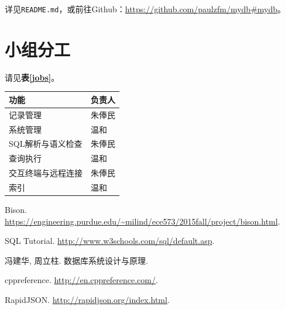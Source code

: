 \documentclass[11pt, a4paper]{article}
\makeatletter
\newcommand\tcaption{\def\@captype{table}\caption}
\newcommand{\tref}[1]{\textbf{表\ref{#1}}}
\makeatother
\begin{document}
详见\texttt{README.md}，或前往Github：\url{https://github.com/paulzfm/mydb#mydb}。

\section{小组分工}

请见\tref{jobs}。

\begin{center}
    \tcaption{小组分工}\label{jobs}
    \begin{tabular}{ll}
        \toprule
        功能 & 负责人 \\
        \midrule
        记录管理 & 朱俸民 \\
        系统管理 & 温和 \\
        SQL解析与语义检查 & 朱俸民 \\
        查询执行 & 温和 \\
        交互终端与远程连接 & 朱俸民 \\
        索引 & 温和 \\
        \bottomrule
    \end{tabular}
\end{center}

\renewcommand{\refname}{参考资料}

\begin{thebibliography}{9}

 Bison. \url{https://engineering.purdue.edu/~milind/ece573/2015fall/project/bison.html}.

 SQL Tutorial. \url{http://www.w3schools.com/sql/default.asp}.

 冯建华, 周立柱. 数据库系统设计与原理. 

 cppreference. \url{http://en.cppreference.com/}.

 RapidJSON. \url{http://rapidjson.org/index.html}.

\end{thebibliography}
\end{document}
